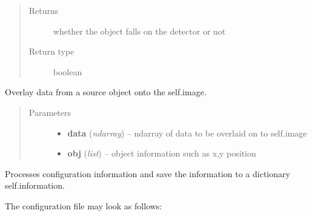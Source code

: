 \documentclass[a4paper,11pt,english]{sphinxmanual}
\begin{document}
\begin{fulllineitems}
\begin{fulllineitems}
\begin{quote}
\begin{description}
\item[{Returns}] \leavevmode
whether the object falls on the detector or not

\item[{Return type}] \leavevmode
boolean

\end{description}\end{quote}

\end{fulllineitems}


\begin{fulllineitems}
\label{simulator:simulator.simulator.VISsimulator.overlayToCCD}
Overlay data from a source object onto the self.image.
\begin{quote}\begin{description}
\item[{Parameters}] \leavevmode\begin{itemize}
\item {} 
\textbf{data} (\emph{ndarray}) -- ndarray of data to be overlaid on to self.image

\item {} 
\textbf{obj} (\emph{list}) -- object information such as x,y position

\end{itemize}

\end{description}\end{quote}

\end{fulllineitems}


\begin{fulllineitems}
\label{simulator:simulator.simulator.VISsimulator.processConfigs}
Processes configuration information and save the information to a dictionary self.information.

The configuration file may look as follows:


\end{fulllineitems}
\end{fulllineitems}
\end{document}

